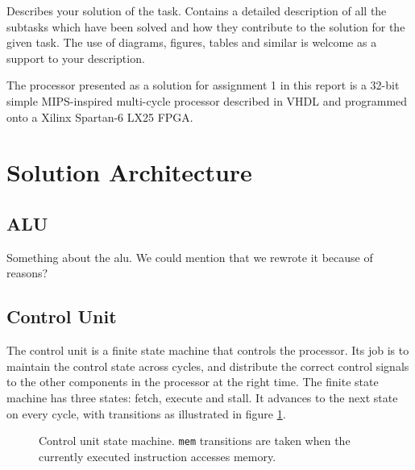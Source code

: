 Describes your solution of the task.
Contains a detailed description of all the subtasks which have been solved and how they contribute to the solution for the given task.
The use of diagrams, figures, tables and similar is welcome as a support to your description.

The processor presented as a solution for assignment 1 in this report is a 32-bit simple MIPS-inspired multi-cycle processor described in VHDL and programmed onto a Xilinx Spartan-6 LX25 FPGA.

\section{Solution Architecture}




\subsection{ALU}

Something about the alu. We could mention that we rewrote it because of reasons?

\subsection{Control Unit}

The control unit is a finite state machine that controls the processor.
Its job is to maintain the control state across cycles, and distribute the correct control signals to the other components in the processor at the right time.
The finite state machine has three states: fetch, execute and stall.
It advances to the next state on every cycle, with transitions as illustrated in figure \ref{figure:control-unit-state-machine}.

\begin{figure}[h]
    \begin{center}
            \caption{
                Control unit state machine.
                \texttt{mem} transitions are taken when the currently executed instruction accesses memory.
            }
            \label{figure:control-unit-state-machine}
    \end{center}
\end{figure}

